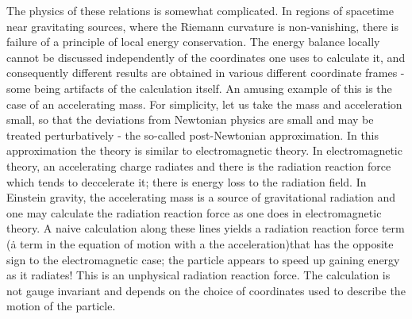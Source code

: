 \documentclass[12pt]{article}
\begin{document}
The physics of these relations is somewhat complicated. In regions of spacetime
near gravitating sources, where the Riemann curvature is non-vanishing,
there is  failure of a principle of local energy conservation. The energy balance locally
cannot be discussed independently of the coordinates one uses to calculate
it, and consequently different results are obtained in various different
coordinate frames - some being artifacts of the calculation itself.
An amusing example of this is the case of an accelerating
mass.  For simplicity, let us take the mass and acceleration small, so that the
deviations from Newtonian physics are small and may be treated perturbatively -
the so-called post-Newtonian approximation.
In this approximation the theory is  similar to electromagnetic theory.  In
electromagnetic theory, an accelerating charge radiates and there is the radiation
reaction force which tends to deccelerate it; there is energy loss to the
radiation field.  In Einstein gravity, the accelerating mass is a source of
gravitational radiation and one may calculate the radiation reaction force as
one does in electromagnetic theory.  A naive calculation along these lines
yields a radiation reaction force term  (\.{a}
term in the equation of motion with a the acceleration)that has the opposite sign to the electromagnetic
case; the particle appears to speed up gaining energy as it
radiates!  This is an unphysical radiation reaction force.
The calculation is not gauge invariant and  depends on the
choice of coordinates used to describe the motion of the particle.
\end{document}
